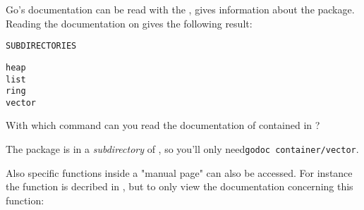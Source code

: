 \begin{Exercise}[title={Documentation},difficulty=1]
\label{ex:doc}
\Question
Go's documentation can be read with the , 
gives information about the  package. Reading the
documentation on  gives the following result:
\begin{alltt}
SUBDIRECTORIES

heap
list
ring
vector
\end{alltt}

With which  command can you read the documentation of  contained in
?

\end{Exercise}

\begin{Answer}
\Question
The package  is in a \emph{subdirectory} of
, so you'll only need\quad \texttt{godoc
container/vector}.

Also specific functions inside a "manual page" can also be accessed. For
instance the function  is decribed in , but to
only view the documentation concerning this function: 

\end{Answer}


